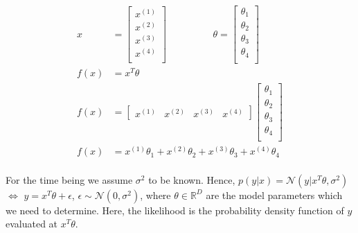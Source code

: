 \documentclass[12pt]{article}
\numberwithin{equation}{section}
\begin{document}
\begin{align*}
	x&=\begin{bmatrix}
		x^{(1)}\\
		x^{(2)}\\
		x^{(3)}\\
		x^{(4)}\\
	\end{bmatrix}
\hspace{2cm}	\theta=\begin{bmatrix}
		\theta_{1}\\
		\theta_{2}\\
		\theta_{3}\\
		\theta_{4}\\
	\end{bmatrix}\\
f(x)&=x^T\theta\\
f(x)&=\begin{bmatrix}
	x^{(1)} & x^{(2)} & x^{(3)} & x^{(4)}
\end{bmatrix}
\begin{bmatrix}
	\theta_{1}\\
	\theta_{2}\\
	\theta_{3}\\
	\theta_{4}\\
\end{bmatrix}\\
f(x)&= x^{(1)}\theta_{1} + x^{(2)}\theta_{2} + x^{(3)}\theta_{3} + x^{(4)}\theta_{4}
\end{align*}\\
For the time being we assume $\sigma^2$ to be known. Hence, 	$p(y|x)= \mathcal{N}(y|x^T\theta,\sigma^2)$ $\Leftrightarrow$ $y = x^T\theta + \epsilon$, $\epsilon \sim \mathcal{N}(0,\sigma^2)$, where $\theta \in \mathbb{R}^D$ are the model parameters which we need to determine. Here, the likelihood is the probability density function of $y$ evaluated at $x^T\theta$.
\end{document}
